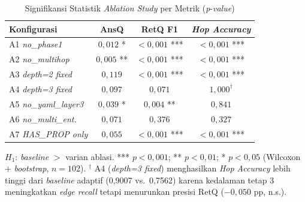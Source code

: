 \renewcommand{\arraystretch}{1.3}
\captionsetup[table]{justification=raggedright,singlelinecheck=false}
\begin{table}[H]
\caption{Signifikansi Statistik \textit{Ablation Study} per Metrik (\textit{p}-\textit{value})}
\label{tbl:ablation_significance}
\centering
\begin{footnotesize}
\setlength{\tabcolsep}{5pt}
\begin{tabular}{| p{} | c | c | c |}
\hline
\textbf{Konfigurasi} & \textbf{AnsQ} & \textbf{RetQ F1} & \textbf{\textit{Hop Accuracy}} \\
\hline
A1 \textit{no\_phase1}       & $0{,}012$ * & $<0{,}001$ *** & $<0{,}001$ *** \\
\hline
A2 \textit{no\_multihop}     & $0{,}005$ ** & $<0{,}001$ *** & $<0{,}001$ *** \\
\hline
A3 \textit{depth=2 fixed}    & $0{,}119$ & $<0{,}001$ *** & $<0{,}001$ *** \\
\hline
A4 \textit{depth=3 fixed}    & $0{,}097$ & $0{,}071$ & $1{,}000^\dagger$ \\
\hline
A5 \textit{no\_yaml\_layer3} & $0{,}039$ * & $0{,}004$ ** & $0{,}841$ \\
\hline
A6 \textit{no\_multi\_ent.} & $0{,}071$ & $0{,}376$ & $0{,}327$ \\
\hline
A7 \textit{HAS\_PROP only}   & $0{,}055$ & $<0{,}001$ *** & $<0{,}001$ *** \\
\hline
\end{tabular}
\end{footnotesize}
\end{table}
{\footnotesize\noindent $H_1$: \textit{baseline} $>$ varian ablasi. *** $p<0{,}001$; ** $p<0{,}01$; * $p<0{,}05$ (Wilcoxon + \textit{bootstrap}, $n{=}102$). $^\dagger$ A4 (\textit{depth=3 fixed}) menghasilkan \textit{Hop Accuracy} lebih tinggi dari \textit{baseline} adaptif (0,9007 vs.\ 0,7562) karena kedalaman tetap 3 meningkatkan \textit{edge recall} tetapi menurunkan presisi RetQ ($-0{,}050$ pp, n.s.).}
